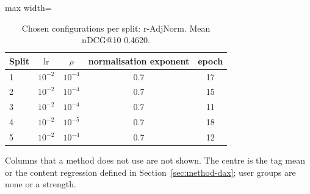 \begin{table}[tbp]
\centering
\footnotesize
\caption{Chosen configurations per split: r-AdjNorm. Mean nDCG@10 0.4620.}
\label{tab:grid07}
\begin{adjustbox}{max width=\linewidth}
\begin{tabular}{lcccc}
\toprule
Split & $\mathrm{lr}$ & $\rho$ & normalisation exponent & epoch \\
\midrule
1 & $10^{-2}$ & $10^{-4}$ & 0.7 & 17 \\
2 & $10^{-2}$ & $10^{-4}$ & 0.7 & 15 \\
3 & $10^{-2}$ & $10^{-4}$ & 0.7 & 11 \\
4 & $10^{-2}$ & $10^{-5}$ & 0.7 & 18 \\
5 & $10^{-2}$ & $10^{-4}$ & 0.7 & 12 \\
\bottomrule
\end{tabular}
\end{adjustbox}
\par\smallskip
\begin{minipage}{\linewidth}\raggedright\footnotesize Columns that a method does not use are not shown. The centre is the tag mean or the content regression defined in Section~\ref{sec:method-dax}; user groups are none or a strength.\end{minipage}
\end{table}
